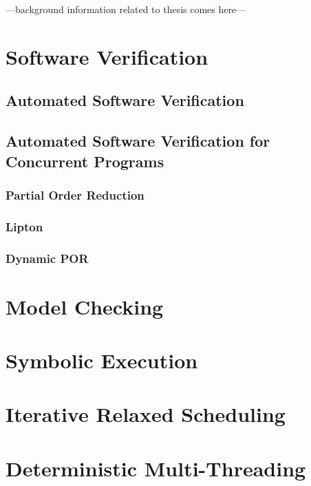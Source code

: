 ---background information related to thesis comes here---
\section{Software Verification}

\subsection{Automated Software Verification}

\subsection{Automated Software Verification for Concurrent Programs}
\subsubsection{Partial Order Reduction}
\subsubsection{Lipton}
\subsubsection{Dynamic POR}

\section{Model Checking}
\section{Symbolic Execution}

\section{Iterative Relaxed Scheduling}
\section{Deterministic Multi-Threading}
